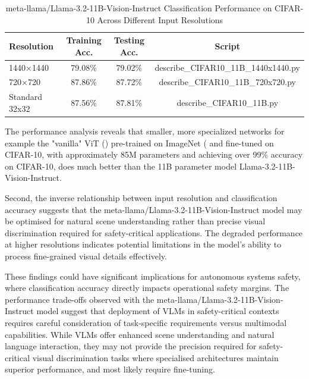 \begin{table}[ht]
\centering
\begin{tabular}{@{}lccc@{}}
\toprule
Resolution & Training Acc. & Testing Acc. & Script \\
\midrule
1440×1440 & 79.08\% & 79.02\% & describe\_CIFAR10\_11B\_1440x1440.py \\
720×720 & 87.86\% & 87.72\% & describe\_CIFAR10\_11B\_720x720.py \\
Standard 32x32 & 87.56\% & 87.81\% & describe\_CIFAR10\_11B.py \\
\bottomrule
\end{tabular}
\caption{meta-llama/Llama-3.2-11B-Vision-Instruct Classification Performance on CIFAR-10 Across Different Input Resolutions}
\label{tab:vlm_cifar10_results}
\end{table}

The performance analysis reveals that smaller, more specialized networks for example the "vanilla" ViT (\cite{dosovitskiy2021image}) pre-trained on ImageNet (\cite{google2021vitbasepatch16224} and fine-tuned on CIFAR-10, with approximately 85M parameters and achieving over 99\% accuracy on CIFAR-10, does much better than the 11B parameter model Llama-3.2-11B-Vision-Instruct.

Second, the inverse relationship between input resolution and classification accuracy suggests that the meta-llama/Llama-3.2-11B-Vision-Instruct model may be optimised for natural scene understanding rather than precise visual discrimination required for safety-critical applications. The degraded performance at higher resolutions indicates potential limitations in the model's ability to process fine-grained visual details effectively.


These findings could have significant implications for autonomous systems safety, where classification accuracy directly impacts operational safety margins. The performance trade-offs observed with the meta-llama/Llama-3.2-11B-Vision-Instruct model suggest that deployment of VLMs in safety-critical contexts requires careful consideration of task-specific requirements versus multimodal capabilities. While VLMs offer enhanced scene understanding and natural language interaction, they may not provide the precision required for safety-critical visual discrimination tasks where specialised architectures maintain superior performance, and most likely require fine-tuning.

